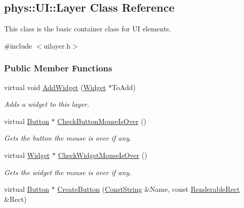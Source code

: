 \hypertarget{classphys_1_1UI_1_1Layer}{
\subsection{phys::UI::Layer Class Reference}
\label{classphys_1_1UI_1_1Layer}
}


This class is the basic container class for UI elements.  




{\ttfamily \#include $<$uilayer.h$>$}

\subsubsection*{Public Member Functions}
\begin{DoxyCompactItemize}
\item 
virtual void \hyperlink{classphys_1_1UI_1_1Layer_ae2425e1ca2a7dd8f5912dad497f3beca}{AddWidget} (\hyperlink{classphys_1_1UI_1_1Widget}{Widget} $\ast$ToAdd)
\begin{DoxyCompactList}\small\item\em Adds a widget to this layer. \item\end{DoxyCompactList}\item 
virtual \hyperlink{classphys_1_1UI_1_1Button}{Button} $\ast$ \hyperlink{classphys_1_1UI_1_1Layer_a3d401a77704cba509b418c53f92cc09d}{CheckButtonMouseIsOver} ()
\begin{DoxyCompactList}\small\item\em Gets the button the mouse is over if any. \item\end{DoxyCompactList}\item 
virtual \hyperlink{classphys_1_1UI_1_1Widget}{Widget} $\ast$ \hyperlink{classphys_1_1UI_1_1Layer_ae80bef48442ac0737bfc1939fc2f9af1}{CheckWidgetMouseIsOver} ()
\begin{DoxyCompactList}\small\item\em Gets the widget the mouse is over if any. \item\end{DoxyCompactList}\item 
virtual \hyperlink{classphys_1_1UI_1_1Button}{Button} $\ast$ \hyperlink{classphys_1_1UI_1_1Layer_a3ccff67009451eb1468d78a52edcbccf}{CreateButton} (\hyperlink{namespacephys_a5ce5049f8b4bf88d6413c47b504ebb31}{ConstString} \&Name, const \hyperlink{structphys_1_1UI_1_1RenderableRect}{RenderableRect} \&Rect)

\end{DoxyCompactItemize}
